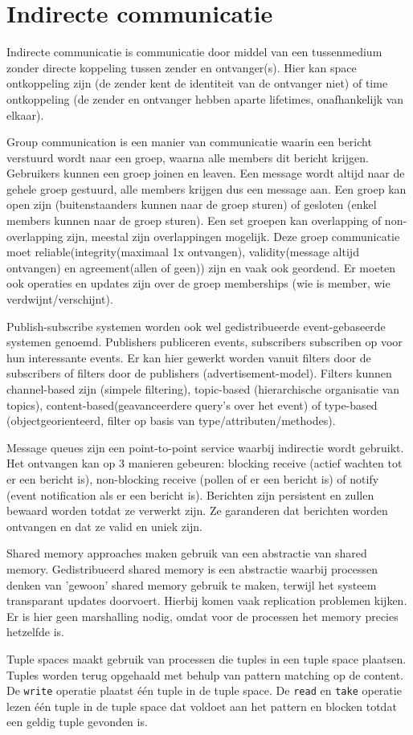 \documentclass[../samenvatting.tex]{subfiles}
\begin{document}
\chapter{Indirecte communicatie}

Indirecte communicatie is communicatie door middel van een tussenmedium zonder directe koppeling tussen zender en ontvanger(s). Hier kan space ontkoppeling zijn (de zender kent de identiteit van de ontvanger niet) of time ontkoppeling (de zender en ontvanger hebben aparte lifetimes, onafhankelijk van elkaar).

Group communication is een manier van communicatie waarin een bericht verstuurd wordt naar een groep, waarna alle members dit bericht krijgen. Gebruikers kunnen een groep joinen en leaven. Een message wordt altijd naar de gehele groep gestuurd, alle members krijgen dus een message aan. Een groep kan open zijn (buitenstaanders kunnen naar de groep sturen) of gesloten (enkel members kunnen naar de groep sturen). Een set groepen kan overlapping of non-overlapping zijn, meestal zijn overlappingen mogelijk. Deze groep communicatie moet reliable(integrity(maximaal 1x ontvangen), validity(message altijd ontvangen) en agreement(allen of geen)) zijn en vaak ook geordend. Er moeten ook operaties en updates zijn over de groep memberships (wie is member, wie verdwijnt/verschijnt).

Publish-subscribe systemen worden ook wel gedistribueerde event-gebaseerde systemen genoemd. Publishers publiceren events, subscribers subscriben op voor hun interessante events. Er kan hier gewerkt worden vanuit filters door de subscribers of filters door de publishers (advertisement-model). Filters kunnen channel-based zijn (simpele filtering), topic-based (hierarchische organisatie van topics), content-based(geavanceerdere query's over het event) of type-based (objectgeorienteerd, filter op basis van type/attributen/methodes).

Message queues zijn een point-to-point service waarbij indirectie wordt gebruikt. Het ontvangen kan op 3 manieren gebeuren: blocking receive (actief wachten tot er een bericht is), non-blocking receive (pollen of er een bericht is) of notify (event notification als er een bericht is). Berichten zijn persistent en zullen bewaard worden totdat ze verwerkt zijn. Ze garanderen dat berichten worden ontvangen en dat ze valid en uniek zijn.

Shared memory approaches maken gebruik van een abstractie van shared memory. Gedistribueerd shared memory is een abstractie waarbij processen denken van 'gewoon' shared memory gebruik te maken, terwijl het systeem transparant updates doorvoert. Hierbij komen vaak replication problemen kijken. Er is hier geen marshalling nodig, omdat voor de processen het memory precies hetzelfde is.

Tuple spaces maakt gebruik van processen die tuples in een tuple space plaatsen. Tuples worden terug opgehaald met behulp van pattern matching op de content. De \texttt{write} operatie plaatst één tuple in de tuple space. De \texttt{read} en \texttt{take} operatie lezen één tuple in de tuple space dat voldoet aan het pattern en blocken totdat een geldig tuple gevonden is.
\end{document}

